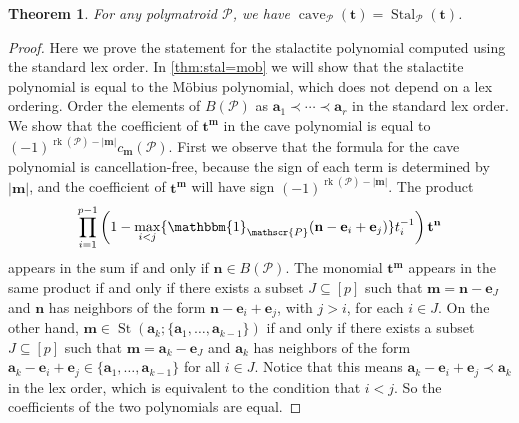 \documentclass[a4paper, 11pt]{amsart}
\newtheorem{theorem}{Theorem}[section]
\theoremstyle{definition}
\newcommand{\bfm}{\mathbf{m}}
\newcommand{\bfn}{\mathbf{n}}
\newcommand{\bft}{\mathbf{t}}
\newcommand{\bfa}{\mathbf{a}}
\newcommand{\bfe}{\mathbf{e}}
\newcommand{\sP}{\mathscr{P}}
\DeclareMathOperator{\rk}{rk}
\DeclareMathOperator{\St}{St}
\DeclareMathOperator{\cave}{cave}
\DeclareMathOperator{\Stal}{Stal}
\begin{document}
 \begin{theorem}\label{thm:cave=stal}
     For any polymatroid $\sP$, we have $\cave_{\sP}(\bft) = \Stal_{\sP}(\bft)$. 
 \end{theorem}
 \begin{proof}
     Here we prove the statement for the stalactite polynomial computed using the standard lex order. In \autoref{thm:stal=mob} we will show that the stalactite polynomial is equal to the M\"obius polynomial, which does not depend on a lex ordering.  Order the elements of $B(\sP)$ as $\bfa_1 \prec \cdots \prec \bfa_r$ in the standard lex order. We show that the coefficient of $\bft^\bfm$ in the cave polynomial is equal to $(-1)^{\rk(\sP)-|\bfm|}c_\bfm(\sP)$. First we observe that the formula for the cave polynomial is cancellation-free, because the sign of each term is determined by $|\bfm|$, and the coefficient of $\bft^\bfm$ will have sign $(-1)^{\rk(\sP)-|\bfm|}$. The product $$\prod_{i=1}^{p-1}\left(1-\max_{i<j}\{\mathbbm{1}_{\sP}(\bfn-\bfe_i+\bfe_j)\}t_i^{-1}\right)\bft^\bfn$$ appears in the sum if and only if $\bfn \in B(\sP)$. The monomial $\bft^\bfm$ appears in the same product if and only if there exists a subset $J \subseteq [p]$ such that $\bfm = \bfn - \bfe_J$ and $\bfn$ has neighbors of the form $\bfn-\bfe_i+\bfe_j$, with $j > i$, for each $i \in J$. On the other hand, $\bfm \in \St(\bfa_k; \{\bfa_1, \ldots, \bfa_{k-1}\})$ if and only if there exists a subset $J \subseteq [p]$ such that $\bfm = \bfa_k-\bfe_J$ and $\bfa_k$ has neighbors of the form $\bfa_k-\bfe_i+\bfe_j \in \{\bfa_1, \ldots, \bfa_{k-1}\}$ for all $i \in J$. Notice that this means $\bfa_k-\bfe_i+\bfe_j \prec \bfa_k$ in the lex order, which is equivalent to the condition that $i < j$. So the coefficients of the two polynomials are equal. 
 \end{proof}
\end{document}
